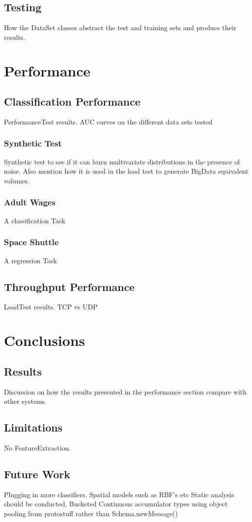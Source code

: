 \documentclass[a4paper,11pt]{scrreprt}
\begin{document}
\section{Testing}
How the DataSet classes abstract the test and training sets and produce their results.
\chapter{Performance}
\section{Classification Performance}
PerformanceTest results. AUC curves on the different data sets tested
\subsection{Synthetic Test}
Synthetic test to see if it can learn multivariate distributions in the presence of noise. Also mention how it is used in the load test to generate BigData equivalent volumes.
\subsection{Adult Wages}
A classification Task
\subsection{Space Shuttle}
A regression Task
\section{Throughput Performance}
LoadTest results. TCP vs UDP
\chapter{Conclusions}
\section{Results}
Discussion on how the results presented in the performance section compare with other systems.
\section{Limitations}
No FeatureExtraction.
\section{Future Work}
Plugging in more classifiers. Spatial models such as RBF's etc
Static analysis should be conducted,
Bucketed Continuous accumulator types
using object pooling from protostuff rather than Schema.newMessage()

\printbibliography
\end{document}
